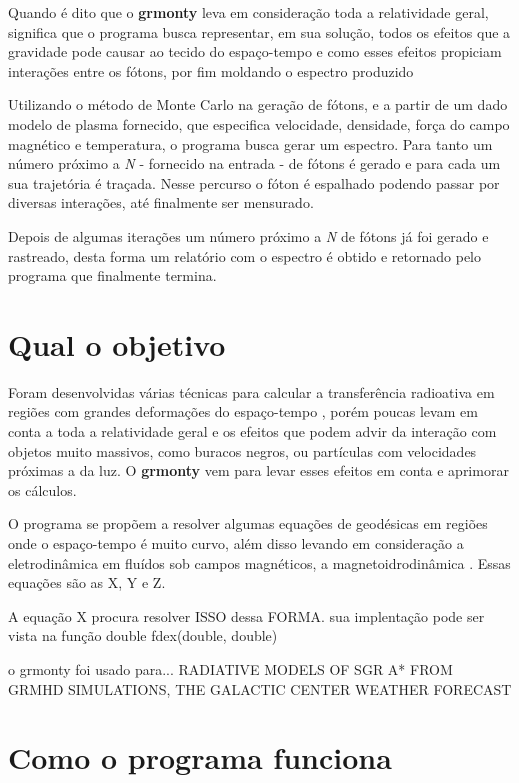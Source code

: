   Quando é dito que o \textbf{grmonty} leva em consideração toda a relatividade geral, significa que o programa busca representar, em sua solução, todos os efeitos que a gravidade pode causar ao tecido do espaço-tempo e como esses efeitos propiciam interações entre os fótons, por fim moldando o espectro produzido

  Utilizando o método de Monte Carlo na geração de fótons, e a partir de um dado modelo de plasma fornecido, que especifica velocidade, densidade, força do campo magnético e temperatura, o programa busca gerar um espectro. Para tanto um número próximo a \textit{N} - fornecido na entrada - de fótons é gerado e para cada um sua trajetória é traçada. Nesse percurso o fóton é espalhado podendo passar por diversas interações, até finalmente ser mensurado.

  Depois de algumas iterações um número próximo a \textit{N} de fótons já foi gerado e rastreado, desta forma um relatório com o espectro é obtido e retornado pelo programa que finalmente termina.

\section{Qual o objetivo}
  Foram desenvolvidas várias técnicas para calcular a transferência radioativa em regiões com grandes deformações do espaço-tempo \citep{Dolence:09}, porém poucas levam em conta a toda a relatividade geral e os efeitos que podem advir da interação com objetos muito massivos, como buracos negros, ou partículas com velocidades próximas a da luz. O \textbf{grmonty} vem para levar esses efeitos em conta e aprimorar os cálculos.

  O programa se propõem a resolver algumas equações de geodésicas em regiões onde o espaço-tempo é muito curvo, além disso levando em consideração a eletrodinâmica em fluídos sob campos magnéticos, a magnetoidrodinâmica \cite{eletro-hidro-dynamic:42}. Essas equações são as X, Y e Z.

  A equação X procura resolver ISSO dessa FORMA. sua implentação pode ser vista na função double fdex(double, double)

  o grmonty foi usado para... RADIATIVE MODELS OF SGR A* FROM GRMHD SIMULATIONS, THE GALACTIC CENTER WEATHER FORECAST

\section{Como o programa funciona}
\label{sec:comofaz}

